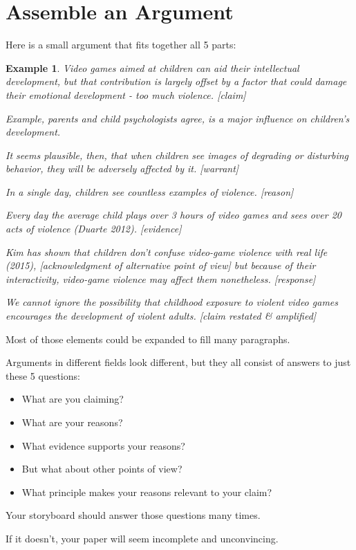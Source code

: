 \documentclass[oneside]{book}
\numberwithin{equation}{section}
\newtheorem{example}{Example}[section]
\begin{document}
\section{Assemble an Argument}
Here is a small argument that fits together all 5 parts:
\begin{example}
    Video games aimed at children can aid their intellectual development, but that contribution is largely offset by a factor that could damage their emotional development - too much violence. \emph{[claim]}
    
    Example, parents and child psychologists agree, is a major influence on children's development.
    
    It seems plausible, then, that when children see images of degrading or disturbing behavior, they will be adversely affected by it. \emph{[warrant]}
    
    In a single day, children see countless examples of violence. \emph{[reason]}
    
    Every day the average child plays over 3 hours of video games and sees over 20 acts of violence (Duarte 2012). \emph{[evidence]}
    
    Kim has shown that children don't confuse video-game violence with real life (2015), \emph{[acknowledgment of alternative point of view]} but because of their interactivity, video-game violence may affect them nonetheless. \emph{[response]}
    
    We cannot ignore the possibility that childhood exposure to violent video games encourages the development of violent adults. \emph{[claim restated \& amplified]}
\end{example}
Most of those elements could be expanded to fill many paragraphs.

%
Arguments in different fields look different, but they all consist of answers to just these 5 questions:
\begin{itemize}
    \item What are you claiming?
    \item What are your reasons?
    \item What evidence supports your reasons?
    \item But what about other points of view?
    \item What principle makes your reasons relevant to your claim?
\end{itemize}
Your storyboard should answer those questions many times.

If it doesn't, your paper will seem incomplete and unconvincing.
\end{document}
